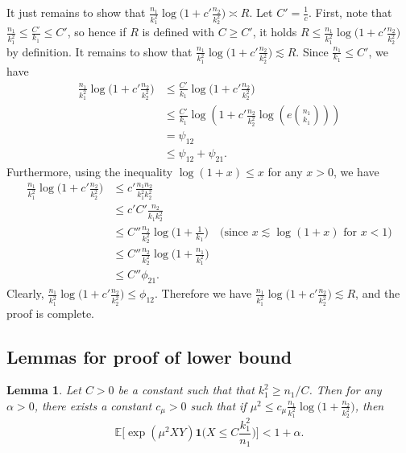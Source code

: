 \documentclass{article}
\newcommand{\EE}{\mathbb{E}}
\newcommand{\one}{\mathbf{1}}
\newtheorem{lemma}{Lemma}
\begin{document}
It just remains to show that $\frac{n_1}{k_1^2}\log\big(1 + c'\frac{n_2}{k_2^2}\big) \asymp R$. Let $C' = \frac1c$. First, note that $\frac{n_1}{k_1^2} \leq \frac{C'}{k_1} \leq C'$, so hence if $R$ is defined with $C \geq C'$, it holds $R \leq \frac{n_1}{k_1^2}\log\big(1 + c'\frac{n_2}{k_2^2}\big)$ by definition. It remains to show that $\frac{n_1}{k_1^2}\log\big(1 + c'\frac{n_2}{k_2^2}\big) \lesssim R$. Since $\frac{n_1}{k_1} \leq C'$, we have
\begin{align*}
    \frac{n_1}{k_1^2}\log\big(1 + c'\frac{n_2}{k_2^2}\big) &\leq \frac{C'}{k_1}\log\big(1 + c'\frac{n_2}{k_2^2}\big) \\
    &\leq  \frac{C'}{k_1}\log\left(1 + c'\frac{n_2}{k_2^2}\log \left(e {n_1 \choose k_1}\right)\right) \\
    &= \psi_{12} \\
    &\leq \psi_{12} + \psi_{21}.
\end{align*}
Furthermore, using the inequality $\log(1 + x) \leq x$ for any $x > 0$, we have
\begin{align*}
    \frac{n_1}{k_1^2}\log\big(1 + c'\frac{n_2}{k_2^2}\big) 
    &\leq c'\frac{n_1n_2}{k_1^2k_2^2} \\
    &\leq c' C' \frac{n_2}{k_1k_2^2} \\
    &\leq C''\frac{n_2}{k_2^2}\log\Big(1 + \frac{1}{k_1}\Big) \quad \text{(since $x \lesssim \log(1 + x)$ for $x < 1$)}\\
    &\leq C''\frac{n_2}{k_2^2}\log\Big(1 + \frac{n_1}{k^2_1}\Big) \\
    &\leq C'' \phi_{21}.
\end{align*}
Clearly, $\frac{n_1}{k_1^2}\log\big(1 + c'\frac{n_2}{k_2^2}\big) \leq \phi_{12}$. Therefore we have $\frac{n_1}{k_1^2}\log\big(1 + c'\frac{n_2}{k_2^2}\big) \lesssim R$, and the proof is complete.
\subsection{Lemmas for proof of lower bound}\label{sec_lemmak_lb}
\begin{lemma}\label{lemma:lb-principal-term}
    Let $C > 0$ be a constant such that that $k_1^2 \geq n_1 / C$. Then for any $\alpha > 0$, there exists a constant $c_{\mu} > 0$ such that  if $\mu^2 \leq c_{\mu}\frac{n_1}{k_1^2}\log\big(1 + \frac{n_2}{k_2^2}\big)$, then
    \[\EE\Big[\exp(\mu^2XY)\one\big(X \leq C \frac{k_1^2}{n_1}\big)\Big] < 1 + \alpha.\]
\end{lemma}
\end{document}
